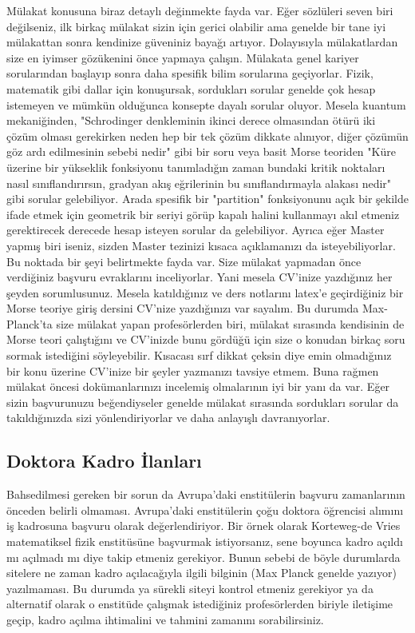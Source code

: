 \documentclass[12pt]{article}
\begin{document}
Mülakat konusuna biraz detaylı değinmekte fayda var. Eğer sözlüleri seven biri değilseniz, ilk birkaç mülakat sizin için gerici olabilir ama genelde bir tane iyi mülakattan sonra kendinize güveniniz bayağı artıyor. Dolayısıyla mülakatlardan size en iyimser gözükenini önce yapmaya çalışın. Mülakata genel kariyer sorularından başlayıp sonra daha spesifik bilim sorularına geçiyorlar. Fizik, matematik gibi dallar için konuşursak, sordukları sorular genelde çok hesap istemeyen ve mümkün olduğunca konsepte dayalı sorular oluyor. Mesela kuantum mekaniğinden, "Schrodinger denkleminin ikinci derece olmasından ötürü iki çözüm olması gerekirken neden hep bir tek çözüm dikkate alınıyor, diğer çözümün göz ardı edilmesinin sebebi nedir" gibi bir soru veya basit Morse teoriden "Küre üzerine bir yükseklik fonksiyonu tanımladığın zaman bundaki kritik noktaları nasıl sınıflandırırsın, gradyan akış eğrilerinin bu sınıflandırmayla alakası nedir" gibi sorular gelebiliyor. Arada spesifik bir "partition" fonksiyonunu açık bir şekilde ifade etmek için geometrik bir seriyi görüp kapalı halini kullanmayı akıl etmeniz gerektirecek derecede hesap isteyen sorular da gelebiliyor. Ayrıca eğer Master yapmış biri iseniz, sizden Master tezinizi kısaca açıklamanızı da isteyebiliyorlar. Bu noktada bir şeyi belirtmekte fayda var. Size mülakat yapmadan önce verdiğiniz başvuru evraklarını inceliyorlar. Yani mesela CV'inize yazdığınız her şeyden sorumlusunuz. Mesela katıldığınız ve ders notlarını latex'e geçirdiğiniz bir Morse teoriye giriş dersini CV'nize yazdığınızı var sayalım. Bu durumda Max-Planck'ta size mülakat yapan profesörlerden biri, mülakat sırasında kendisinin de Morse teori çalıştığını ve CV'inizde bunu gördüğü için size o konudan birkaç soru sormak istediğini söyleyebilir. Kısacası sırf dikkat çeksin diye emin olmadığınız bir konu üzerine CV'inize bir şeyler yazmanızı tavsiye etmem. Buna rağmen mülakat öncesi dokümanlarınızı incelemiş olmalarının iyi bir yanı da var. Eğer sizin başvurunuzu beğendiyseler genelde mülakat sırasında sordukları sorular da takıldığınızda sizi yönlendiriyorlar ve daha anlayışlı davranıyorlar.

\subsection{Doktora Kadro İlanları}

Bahsedilmesi gereken bir sorun da Avrupa'daki enstitülerin başvuru zamanlarının önceden belirli olmaması. Avrupa'daki enstitülerin çoğu doktora öğrencisi alımını iş kadrosuna başvuru olarak değerlendiriyor. Bir örnek olarak Korteweg-de Vries matematiksel fizik enstitüsüne başvurmak istiyorsanız, sene boyunca kadro açıldı mı açılmadı mı diye takip etmeniz gerekiyor. Bunun sebebi de böyle durumlarda sitelere ne zaman kadro açılacağıyla ilgili bilginin (Max Planck genelde yazıyor) yazılmaması. Bu durumda ya sürekli siteyi kontrol etmeniz gerekiyor ya da alternatif olarak o enstitüde çalışmak istediğiniz profesörlerden biriyle iletişime geçip, kadro açılma ihtimalini ve tahmini zamanını sorabilirsiniz. 
\end{document}
